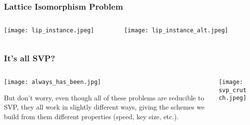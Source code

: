 \documentclass[
aspectratio=169, %
t, %
onlytextwidth, %
10pt, %
]{beamer}
\begin{document}

\begin{frame}
    \frametitle{Lattice Isomorphism Problem}
    \begin{columns}[T] %
        \begin{column}{0.48\linewidth} %
            \texttt{[image: lip\_instance.jpeg]} %
        \end{column}
        \begin{column}{0.48\linewidth} %
            \texttt{[image: lip\_instance\_alt.jpeg]} %
        \end{column}
    \end{columns}
\end{frame}



\begin{frame}
    \frametitle{It's all SVP?}

    \begin{columns}[T] %
        \begin{column}{0.58\linewidth} %
            \texttt{[image: always\_has\_been.jpg]} %

            \vspace{-1.5em}{\tiny\textcolor{ICLBlue}{(Above) Regev discovering the the LWE to $\gamma$-SVP reduction, 2005}}\newline

            \vspace{-2em}But don't worry, even though all of these problems are reducible to SVP, they all work in slightly different ways, giving the schemes we build from them different properties (speed, key size, etc.).
        \end{column}
        \begin{column}{0.38\linewidth} %
            \texttt{[image: svp\_crutch.jpeg]} %

            \vspace{-1.5em}{\tiny\textcolor{ICLBlue}{(Above) xkcd Dependency, lattice based cryptography special edition}}
        \end{column}
    \end{columns}
\end{frame}
\end{document}
